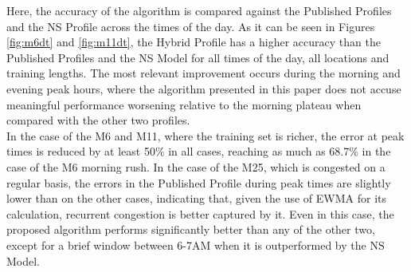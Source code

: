 \documentclass[letterpaper, 10 pt, conference]{ieeeconf}  %
\begin{document}
Here, the accuracy of the algorithm is compared against the Published Profiles and the NS Profile across the times of the day.
As it can be seen in Figures \ref{fig:m6dt} and \ref{fig:m11dt}, the Hybrid Profile has a higher accuracy than the Published Profiles and the NS Model for all times of the day, all locations and training lengths. 
The most relevant improvement occurs during the morning and evening peak hours, where the algorithm presented in this paper does not accuse meaningful performance worsening relative to the morning plateau when compared with the other two profiles.\\
In the case of the M6 and M11, where the training set is richer, the error at peak times is reduced by at least 50\% in all cases, reaching as much as 68.7\% in the case of the M6 morning rush.
In the case of the M25, which is congested on a regular basis, the errors in the Published Profile during peak times are slightly lower than on the other cases, indicating that, given the use of EWMA for its calculation, recurrent congestion is better captured by it. 
Even in this case, the proposed algorithm performs significantly better than any of the other two, except for a brief window between 6-7AM when it is outperformed by the NS Model.
\end{document}
